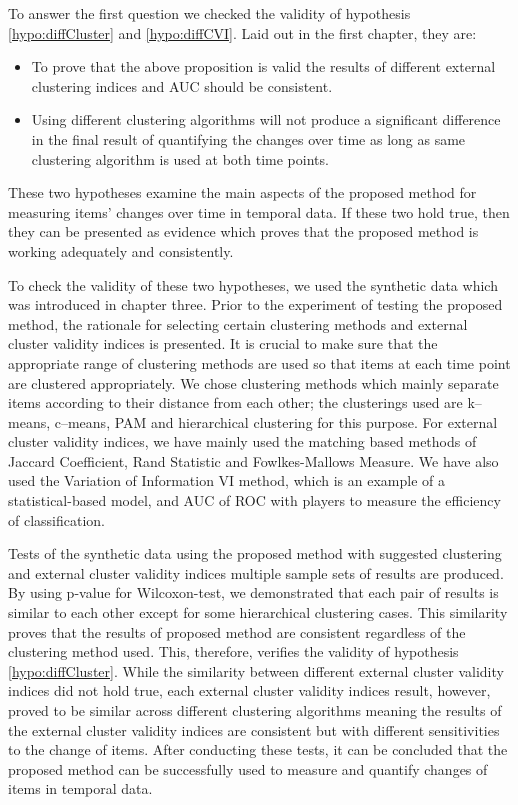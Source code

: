 To answer the first question we checked the validity of hypothesis  \ref{hypo:diffCluster} and \ref{hypo:diffCVI}. Laid out in the first chapter, they are:
\begin{itemize}
    \item To prove that the above proposition is valid the results of different external clustering indices and AUC should be consistent.
    \item Using different clustering algorithms will not produce a significant difference in the final result of quantifying the changes over time as long as same clustering algorithm is used at both time points.
\end{itemize}
These two hypotheses examine the main aspects of the proposed method for measuring items' changes over time in temporal data. If these two hold true, then they can be presented as evidence which proves that the proposed method is working adequately and consistently.


To check the validity of these two hypotheses, we used the synthetic data which was introduced in chapter three. Prior to the experiment of testing the proposed method, the rationale for selecting certain clustering methods and external cluster validity indices is presented. It is crucial to make sure that the appropriate range of clustering methods are used so that items at each time point are clustered appropriately. We chose clustering methods which mainly separate items according to their distance from each other; the clusterings used are k--means, c--means, PAM and hierarchical clustering for this purpose. For external cluster validity indices,  we have mainly used the matching based methods of Jaccard Coefficient, Rand Statistic and Fowlkes-Mallows Measure. We have also used the Variation of Information VI method, which is an example of a statistical-based model, and AUC of ROC with players to measure the efficiency of classification.

Tests of the synthetic data using the proposed method with suggested clustering and external cluster validity indices multiple sample sets of results are produced. By using p-value for Wilcoxon-test, we demonstrated that each pair of results is similar to each other except for some hierarchical clustering cases. This similarity proves that the results of proposed method are consistent regardless of the clustering method used. This, therefore, verifies the validity of hypothesis  \ref{hypo:diffCluster}. While the similarity between different external cluster validity indices did not hold true, each external cluster validity indices result, however, proved to be similar across different clustering algorithms meaning the results of the external cluster validity indices are consistent but with different sensitivities to the change of items. After conducting these tests, it can be concluded that the proposed method can be successfully used to measure and quantify changes of items in temporal data.

